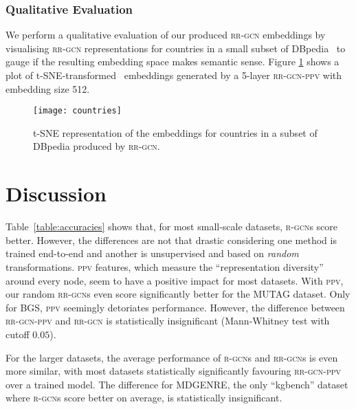 \documentclass{llncs}
\begin{document}
\subsubsection{Qualitative Evaluation} \label{sec:qual_evaluation}
We perform a qualitative evaluation of our produced \textsc{rr-gcn} embeddings by visualising \textsc{rr-gcn} representations for countries in a small subset of DBpedia~\cite{dbpedia,dbpedia_countries} to gauge if the resulting embedding space makes semantic sense. Figure \ref{fig:t-sne-countries} shows a plot of t-SNE-transformed~\cite{van2008visualizing} embeddings generated by a 5-layer \textsc{rr-gcn-ppv} with embedding size 512.
\begin{figure}[h!]
    \centering
    \texttt{[image: countries]}
    \caption{t-SNE representation of the embeddings for countries in a subset of DBpedia produced by \textsc{rr-gcn}.}
    \label{fig:t-sne-countries}
\end{figure}

\section{Discussion} 
Table~\ref{table:accuracies} shows that, for most small-scale datasets, \textsc{r-gcn}s score better. However, the differences are not that drastic considering one method is trained end-to-end and another is unsupervised and based on \textit{random} transformations.
\textsc{ppv} features, which measure the ``representation diversity'' around every node, seem to have a positive impact for most datasets. With \textsc{ppv}, our random \textsc{rr-gcn}s even score significantly better for the MUTAG dataset. Only for BGS, \textsc{ppv} seemingly detoriates performance. However, the difference between \textsc{rr-gcn-ppv} and \textsc{rr-gcn} is statistically insignificant (Mann-Whitney test with cutoff $0.05$).

For the larger datasets, the average performance of \textsc{r-gcn}s and \textsc{rr-gcn}s is even more similar, with most datasets statistically significantly favouring \textsc{rr-gcn-ppv} over a trained model. The difference for MDGENRE, the only ``kgbench'' dataset where \textsc{r-gcn}s score better on average, is statistically insignificant. 
\end{document}
